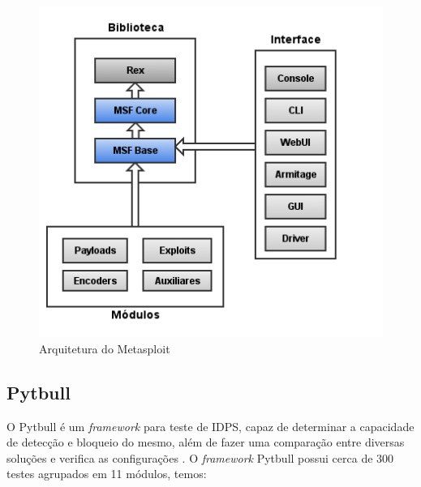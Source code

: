 \documentclass[
	12pt,				
	openright,		
	twoside,	
	a4paper,
	english,	
	brazil	
	]{abntex2}
\begin{document}
 \begin{figure}[!htb]
  \centering
  \includegraphics[scale=.6]{metasploit_arquitetura.png}
  \caption{Arquitetura do Metasploit}
  \label{fig:arqmetasploit}
 \end{figure}

 \subsection{Pytbull} \label{sec:pytbull}

 O Pytbull é um \textit{framework} para teste de IDPS, capaz de determinar a capacidade de detecção e bloqueio do mesmo, além de fazer uma comparação entre diversas soluções e verifica as configurações \cite{pytbull}. O \textit{framework} Pytbull possui cerca de 300 testes agrupados em 11 módulos, temos:
\end{document}
